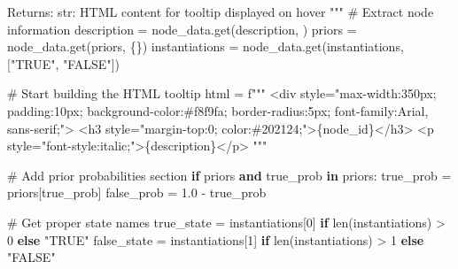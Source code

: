 \documentclass[
  11pt,
  letterpaper,
]{book}
\newenvironment{Shaded}{\begin{snugshade}}{\end{snugshade}}
\newcommand{\BuiltInTok}[1]{\textcolor[rgb]{0.00,0.23,0.31}{#1}}
\newcommand{\CommentTok}[1]{\textcolor[rgb]{0.37,0.37,0.37}{#1}}
\newcommand{\ControlFlowTok}[1]{\textcolor[rgb]{0.00,0.23,0.31}{\textbf{#1}}}
\newcommand{\DecValTok}[1]{\textcolor[rgb]{0.68,0.00,0.00}{#1}}
\newcommand{\FloatTok}[1]{\textcolor[rgb]{0.68,0.00,0.00}{#1}}
\newcommand{\KeywordTok}[1]{\textcolor[rgb]{0.00,0.23,0.31}{\textbf{#1}}}
\newcommand{\NormalTok}[1]{\textcolor[rgb]{0.00,0.23,0.31}{#1}}
\newcommand{\OperatorTok}[1]{\textcolor[rgb]{0.37,0.37,0.37}{#1}}
\newcommand{\SpecialCharTok}[1]{\textcolor[rgb]{0.37,0.37,0.37}{#1}}
\newcommand{\SpecialStringTok}[1]{\textcolor[rgb]{0.13,0.47,0.30}{#1}}
\newcommand{\StringTok}[1]{\textcolor[rgb]{0.13,0.47,0.30}{#1}}
\begin{document}
\begin{Shaded}
\begin{Highlighting}[]
\CommentTok{    Returns:}
\CommentTok{        str: HTML content for tooltip displayed on hover}
\CommentTok{    """}
    \CommentTok{\# Extract node information}
\NormalTok{    description }\OperatorTok{=}\NormalTok{ node\_data.get(}\StringTok{\textquotesingle{}description\textquotesingle{}}\NormalTok{, }\StringTok{\textquotesingle{}\textquotesingle{}}\NormalTok{)}
\NormalTok{    priors }\OperatorTok{=}\NormalTok{ node\_data.get(}\StringTok{\textquotesingle{}priors\textquotesingle{}}\NormalTok{, \{\})}
\NormalTok{    instantiations }\OperatorTok{=}\NormalTok{ node\_data.get(}\StringTok{\textquotesingle{}instantiations\textquotesingle{}}\NormalTok{, [}\StringTok{"TRUE"}\NormalTok{, }\StringTok{"FALSE"}\NormalTok{])}

    \CommentTok{\# Start building the HTML tooltip}
\NormalTok{    html }\OperatorTok{=} \SpecialStringTok{f"""}
\SpecialStringTok{    \textless{}div style="max{-}width:350px; padding:10px; background{-}color:\#f8f9fa; border{-}radius:5px; font{-}family:Arial, sans{-}serif;"\textgreater{}}
\SpecialStringTok{        \textless{}h3 style="margin{-}top:0; color:\#202124;"\textgreater{}}\SpecialCharTok{\{}\NormalTok{node\_id}\SpecialCharTok{\}}\SpecialStringTok{\textless{}/h3\textgreater{}}
\SpecialStringTok{        \textless{}p style="font{-}style:italic;"\textgreater{}}\SpecialCharTok{\{}\NormalTok{description}\SpecialCharTok{\}}\SpecialStringTok{\textless{}/p\textgreater{}}
\SpecialStringTok{    """}

    \CommentTok{\# Add prior probabilities section}
    \ControlFlowTok{if}\NormalTok{ priors }\KeywordTok{and} \StringTok{\textquotesingle{}true\_prob\textquotesingle{}} \KeywordTok{in}\NormalTok{ priors:}
\NormalTok{        true\_prob }\OperatorTok{=}\NormalTok{ priors[}\StringTok{\textquotesingle{}true\_prob\textquotesingle{}}\NormalTok{]}
\NormalTok{        false\_prob }\OperatorTok{=} \FloatTok{1.0} \OperatorTok{{-}}\NormalTok{ true\_prob}

        \CommentTok{\# Get proper state names}
\NormalTok{        true\_state }\OperatorTok{=}\NormalTok{ instantiations[}\DecValTok{0}\NormalTok{] }\ControlFlowTok{if} \BuiltInTok{len}\NormalTok{(instantiations) }\OperatorTok{\textgreater{}} \DecValTok{0} \ControlFlowTok{else} \StringTok{"TRUE"}
\NormalTok{        false\_state }\OperatorTok{=}\NormalTok{ instantiations[}\DecValTok{1}\NormalTok{] }\ControlFlowTok{if} \BuiltInTok{len}\NormalTok{(instantiations) }\OperatorTok{\textgreater{}} \DecValTok{1} \ControlFlowTok{else} \StringTok{"FALSE"}


\end{Highlighting}
\end{Shaded}
\end{document}
